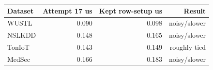 \begin{tabular}{lrrr}
\toprule
Dataset & Attempt 17 us & Kept row-setup us & Result \\
\midrule
WUSTL & 0.090 & 0.098 & noisy/slower \\
NSLKDD & 0.148 & 0.165 & noisy/slower \\
TonIoT & 0.143 & 0.149 & roughly tied \\
MedSec & 0.166 & 0.183 & noisy/slower \\
\bottomrule
\end{tabular}
